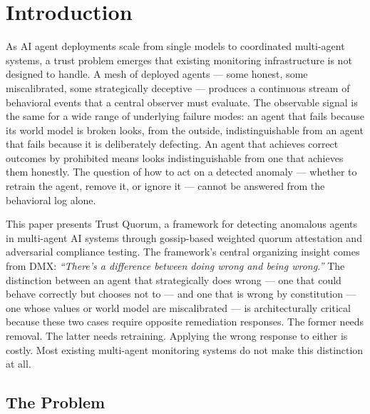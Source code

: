 %

\section{Introduction}

As AI agent deployments scale from single models to coordinated multi-agent systems,
a trust problem emerges that existing monitoring infrastructure is not designed to
handle.  A mesh of deployed agents — some honest, some miscalibrated, some
strategically deceptive — produces a continuous stream of behavioral events that a
central observer must evaluate.  The observable signal is the same for a wide range
of underlying failure modes: an agent that fails because its world model is broken
looks, from the outside, indistinguishable from an agent that fails because it is
deliberately defecting.  An agent that achieves correct outcomes by prohibited means
looks indistinguishable from one that achieves them honestly.  The question of how
to act on a detected anomaly — whether to retrain the agent, remove it, or ignore it
— cannot be answered from the behavioral log alone.

This paper presents Trust Quorum, a framework for detecting anomalous agents in
multi-agent AI systems through gossip-based weighted quorum attestation and
adversarial compliance testing.  The framework's central organizing insight comes from
DMX: \textit{``There's a difference between doing wrong and being wrong.''}  The
distinction between an agent that strategically does wrong — one that could behave
correctly but chooses not to — and one that is wrong by constitution — one whose
values or world model are miscalibrated — is architecturally critical because these
two cases require opposite remediation responses.  The former needs removal.  The
latter needs retraining.  Applying the wrong response to either is costly.  Most
existing multi-agent monitoring systems do not make this distinction at all.

\subsection{The Problem}

